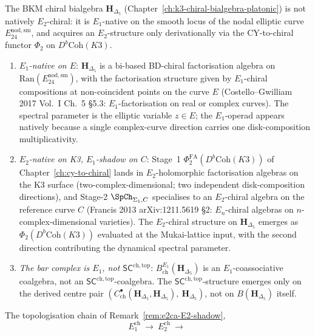 \begin{remark}
\label{rem:e2ca-E1-E2-discipline}
The BKM chiral bialgebra $\mathbf H_{\Delta_5}$
(Chapter~\ref{ch:k3-chiral-bialgebra-platonic}) is not natively
$E_2$-chiral: it is $E_1$-native on the smooth locus of the nodal
elliptic curve $E^{\mathrm{nod,sm}}_{24}$, and acquires an $E_2$-structure
only derivationally via the CY-to-chiral functor $\Phi_2$ on
$D^b\mathrm{Coh}(K3)$.
\begin{enumerate}[label=(\roman*)]
 \item \emph{$E_1$-native on $E$}: $\mathbf H_{\Delta_5}$ is a
 bi-based BD-chiral factorisation algebra on
 $\mathrm{Ran}(E^{\mathrm{nod,sm}}_{24})$, with the factorisation
 structure given by $E_1$-chiral compositions at non-coincident
 points on the curve $E$ (Costello--Gwilliam 2017 Vol.~I Ch.~5
 \S5.3: $E_1$-factorisation on real or complex curves). The
 spectral parameter is the elliptic variable $z\in E$; the
 $E_1$-operad appears natively because a single complex-curve
 direction carries one disk-composition multiplicativity.
 \item \emph{$E_2$-native on K3, $E_1$-shadow on $C$}: Stage~1
 $\Phi^{\mathrm{FA}}_2(D^b\mathrm{Coh}(K3))$ of
 Chapter~\ref{ch:cy-to-chiral} lands in $E_2$-holomorphic
 factorisation algebras on the K3 surface (two-complex-dimensional;
 two independent disk-composition directions), and Stage-2
 $\SpCh_{\Sigma_1, C}$ specialises to an $E_2$-chiral algebra on the
 reference curve $C$ (Francis 2013
 arXiv:1211.5619 \S2: $E_n$-chiral algebras on
 $n$-complex-dimensional varieties). The $E_2$-chiral structure
 on $\mathbf H_{\Delta_5}$ emerges as
 $\Phi_2(D^b\mathrm{Coh}(K3))$ evaluated at the Mukai-lattice
 input, with the second direction contributing the dynamical
 spectral parameter.
 \item \emph{The bar complex is $E_1$, not $\mathsf{SC}^{\mathrm{ch,top}}$}:
 $B^{E_1}_{\mathrm{ch}}(\mathbf H_{\Delta_5})$ is an
 $E_1$-coassociative coalgebra, not an
 $\mathsf{SC}^{\mathrm{ch,top}}$-coalgebra. The
 $\mathsf{SC}^{\mathrm{ch,top}}$-structure emerges only on the
 derived centre pair
 $(C^\bullet_{\mathrm{ch}}(\mathbf H_{\Delta_5},
 \mathbf H_{\Delta_5}),\ \mathbf H_{\Delta_5})$,
 not on $B(\mathbf H_{\Delta_5})$ itself.
\end{enumerate}
The topologisation chain of Remark~\ref{rem:e2ca-E2-shadow},
\[
 E_1^{\mathrm{ch}}\ \to\ E_2^{\mathrm{ch}}\ \to\
\]
\end{remark}
